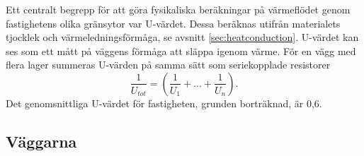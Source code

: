 Ett centralt begrepp för att göra fysikaliska beräkningar på värmeflödet genom fastighetens olika gränsytor var U-värdet. Dessa beräknas utifrån materialets tjocklek och värmeledningsförmåga, se avsnitt \ref{sec:heatconduction}. U-värdet kan ses som ett mått på väggens förmåga att släppa igenom värme. För en vägg med flera lager summeras U-värden på samma sätt som seriekopplade resistorer
\begin{equation}
\label{eq:uvalue}
\frac{1}{U_{tot}}= (\frac{1}{U_1}+...+\frac{1}{U_n}).
\end{equation}
Det genomsnittliga U-värdet för fastigheten, grunden borträknad, är 0,6.

\subsection{Väggarna}
\label{subsec:walls}

